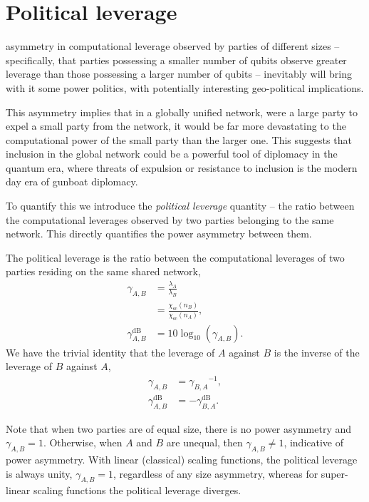 %
%

\section{Political leverage}\label{sec:political_lev}

 asymmetry in computational leverage observed by parties of different sizes -- specifically, that parties possessing a smaller number of qubits observe greater leverage than those possessing a larger number of qubits -- inevitably will bring with it some power politics, with potentially interesting geo-political implications.

This asymmetry implies that in a globally unified network, were a large party to expel a small party from the network, it would be far more devastating to the computational power of the small party than the larger one. This suggests that inclusion in the global network could be a powerful tool of diplomacy in the quantum era, where threats of expulsion or resistance to inclusion is the modern day era of gunboat diplomacy.

To quantify this we introduce the \textit{political leverage} quantity -- the ratio between the computational leverages observed by two parties belonging to the same network. This directly quantifies the power asymmetry between them.

\begin{definition}
The political leverage is the ratio between the computational leverages of two parties residing on the same shared network,
\begin{align}
	\gamma_{A,B} &= \frac{\lambda_A}{\lambda_B}\nonumber\\
	&= \frac{\chi_\mathrm{sc}(n_B)}{\chi_\mathrm{sc}(n_A)},\nonumber\\
	\gamma_{A,B}^\mathrm{dB} &= 10\log_{10}(\gamma_{A,B}).
\end{align}
We have the trivial identity that the leverage of $A$ against $B$ is the inverse of the leverage of $B$ against $A$,
\begin{align}
	\gamma_{A,B} &= {\gamma_{B,A}}^{-1},\nonumber\\
	\gamma_{A,B}^\mathrm{dB} &= -\gamma_{B,A}^\mathrm{dB}.
\end{align}
\end{definition}
Note that when two parties are of equal size, there is no power asymmetry and \mbox{$\gamma_{A,B}=1$}. Otherwise, when $A$ and $B$ are unequal, then \mbox{$\gamma_{A,B}\neq 1$}, indicative of power asymmetry. With linear (classical) scaling functions, the political leverage is always unity, \mbox{$\gamma_{A,B}=1$}, regardless of any size asymmetry, whereas for super-linear scaling functions the political leverage diverges.

